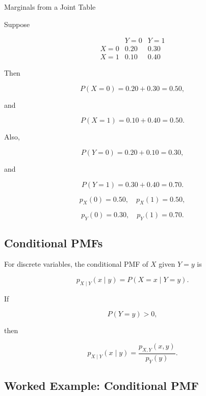 \begin{workedexamplebox}{Marginals from a Joint Table}

Suppose

\[
\begin{array}{c|cc}
 & Y=0 & Y=1\\
\hline
X=0 & 0.20 & 0.30\\
X=1 & 0.10 & 0.40
\end{array}
\]

Then

\[
P(X=0)
=
0.20+0.30
=
0.50,
\]

and

\[
P(X=1)
=
0.10+0.40
=
0.50.
\]

Also,

\[
P(Y=0)
=
0.20+0.10
=
0.30,
\]

and

\[
P(Y=1)
=
0.30+0.40
=
0.70.
\]

\begin{answerbox}
\[
\boxed{
p_X(0)=0.50,\quad
p_X(1)=0.50,
}
\]

\[
\boxed{
p_Y(0)=0.30,\quad
p_Y(1)=0.70.
}
\]
\end{answerbox}

\end{workedexamplebox}

\subsection{Conditional PMFs}
\label{subsec:conditional-pmfs}

For discrete variables, the conditional PMF of \(X\) given \(Y=y\) is

\[
\boxed{
p_{X\mid Y}(x\mid y)
=
P(X=x\mid Y=y).
}
\]

If

\[
P(Y=y)>0,
\]

then

\[
\boxed{
p_{X\mid Y}(x\mid y)
=
\frac{
p_{X,Y}(x,y)
}{
p_Y(y)
}.
}
\]

\subsection{Worked Example: Conditional PMF}
\label{subsec:worked-conditional-pmf}

